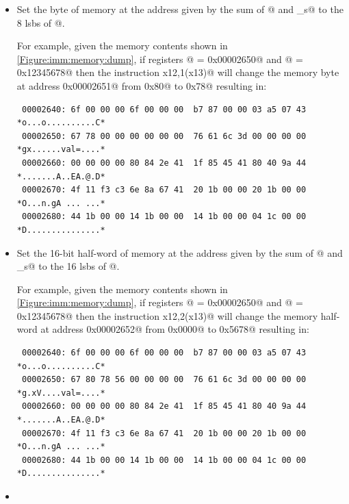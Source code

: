 \begin{itemize}
\item{}
\label{insn:sb}

Set the byte of memory at the address given by the sum of @ and
\verb@imm_s@ to the 8 \acrshort{lsb}s of @.

For example, given the memory contents shown in \autoref{Figure:imm:memory:dump},
if registers @ = \verb@0x00002650@ and @ = \verb@0x12345678@
then the instruction \verb@sb x12,1(x13)@ will change the memory byte at address
\verb@0x00002651@ from \verb@0x80@ to \verb@0x78@ resulting in:

\begin{verbatim}
 00002640: 6f 00 00 00 6f 00 00 00  b7 87 00 00 03 a5 07 43 *o...o..........C*
 00002650: 67 78 00 00 00 00 00 00  76 61 6c 3d 00 00 00 00 *gx......val=....*
 00002660: 00 00 00 00 80 84 2e 41  1f 85 45 41 80 40 9a 44 *.......A..EA.@.D*
 00002670: 4f 11 f3 c3 6e 8a 67 41  20 1b 00 00 20 1b 00 00 *O...n.gA ... ...*
 00002680: 44 1b 00 00 14 1b 00 00  14 1b 00 00 04 1c 00 00 *D...............*
\end{verbatim}

\item{}
\label{insn:sh}

Set the 16-bit half-word of memory at the address given by the sum of @ and
\verb@imm_s@ to the 16 \acrshort{lsb}s of @.

For example, given the memory contents shown in \autoref{Figure:imm:memory:dump},
if registers @ = \verb@0x00002650@ and @ = \verb@0x12345678@
then the instruction \verb@sh x12,2(x13)@ will change the memory half-word at
address \verb@0x00002652@ from \verb@0x0000@ to \verb@0x5678@ resulting in:

\begin{verbatim}
 00002640: 6f 00 00 00 6f 00 00 00  b7 87 00 00 03 a5 07 43 *o...o..........C*
 00002650: 67 80 78 56 00 00 00 00  76 61 6c 3d 00 00 00 00 *g.xV....val=....*
 00002660: 00 00 00 00 80 84 2e 41  1f 85 45 41 80 40 9a 44 *.......A..EA.@.D*
 00002670: 4f 11 f3 c3 6e 8a 67 41  20 1b 00 00 20 1b 00 00 *O...n.gA ... ...*
 00002680: 44 1b 00 00 14 1b 00 00  14 1b 00 00 04 1c 00 00 *D...............*
\end{verbatim}

\item{}
\label{insn:sw}


\end{itemize}
